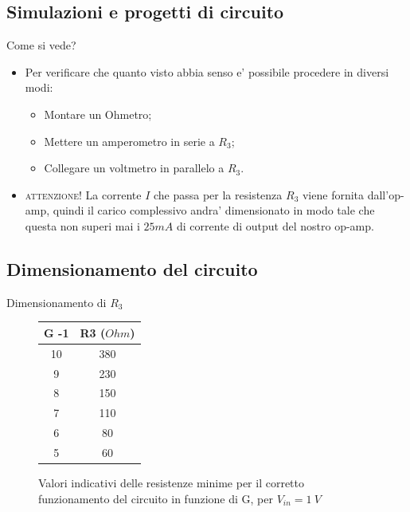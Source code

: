 \documentclass{beamer}
\begin{document}
\subsection{Simulazioni e progetti di circuito}

\begin{frame}{Come si vede?}
\begin{itemize}
\item Per verificare che quanto visto abbia senso e' possibile procedere in diversi modi:

\begin{itemize}
\item Montare un Ohmetro;
\item Mettere un amperometro in serie a $R_3$;
\item Collegare un voltmetro in parallelo a $R_3$.
\end{itemize}

\item \textsc{attenzione!} La corrente $I$ che passa per la resistenza $R_3$ viene fornita dall'op-amp, quindi il carico complessivo andra' dimensionato in modo tale che questa non superi mai i $25\si{mA}$ di corrente di output del nostro op-amp.
\end{itemize}
\end{frame}

\subsection{Dimensionamento del circuito}

\begin{frame}{Dimensionamento di $R_3$}

{
\centering


\begin{figure}


\begin{tabular}{|c|c|}
\hline 
G -1 & R3 ($ \si{Ohm}$) \\ 
\hline 
10 & 380 \\ 
\hline 
9 & 230 \\ 
\hline 
8 & 150 \\ 
\hline 
7 & 110 \\ 
\hline 
6 & 80 \\ 
\hline 
5 & 60 \\ 
\hline 
\end{tabular} 

\caption{Valori indicativi delle resistenze minime per il corretto funzionamento del circuito in funzione di G, per $V_{in} = 1~V$}
\end{figure}

}

\end{frame}
\end{document}
